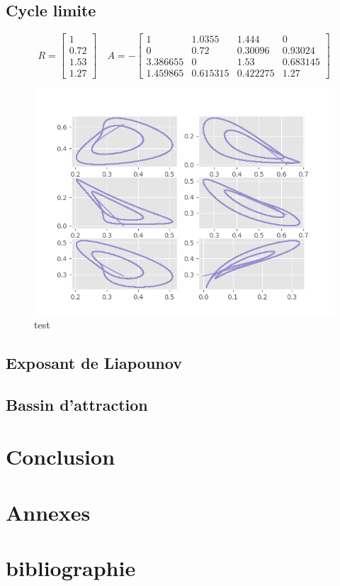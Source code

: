 \documentclass{wsdcr}
\begin{document}
\subsection{Cycle limite}
\begin{equation}
R={\begin{bmatrix}1\\0.72\\1.53\\1.27\end{bmatrix}}\quad A =-{\begin{bmatrix}1&1.0355&1.444&0\\0&0.72&0.30096&0.93024\\3.386655&0&1.53&0.683145\\1.459865&0.615315&0.422275&1.27\end{bmatrix}}
\end{equation}
\begin{figure}[t!]
    \centering
    \includegraphics[width=\linewidth]{fig/lv4_cl.png}
    \caption{test}
    \label{fig:example}
\end{figure}
\subsection{Exposant de Liapounov}
\subsection{Bassin d'attraction}
\section{Conclusion}

\section{Annexes}
\section{bibliographie}
\nocite{*}
\printbibliography



%
\end{document}
